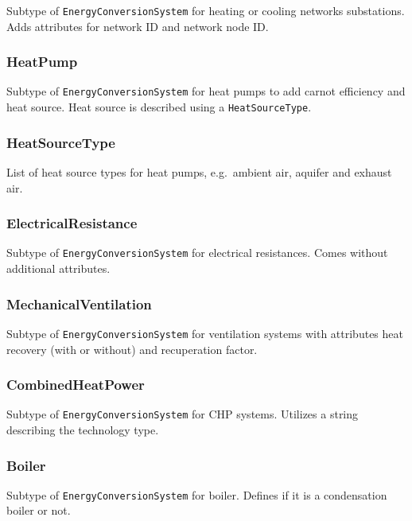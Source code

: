 \documentclass[a4paper,12pt]{article}
\begin{document}
Subtype of \lstinline!EnergyConversionSystem! for heating or cooling
networks substations. Adds attributes for network ID and network node
ID.

\subsubsection{HeatPump}\label{heatpump}

Subtype of \lstinline!EnergyConversionSystem! for heat pumps to add
carnot efficiency and heat source. Heat source is described using a
\lstinline!HeatSourceType!.

\subsubsection{HeatSourceType}\label{heatsourcetype}

List of heat source types for heat pumps, e.g.~ambient air, aquifer and
exhaust air.

\subsubsection{ElectricalResistance}\label{electricalresistance}

Subtype of \lstinline!EnergyConversionSystem! for electrical
resistances. Comes without additional attributes.

\subsubsection{MechanicalVentilation}\label{mechanicalventilation}

Subtype of \lstinline!EnergyConversionSystem! for ventilation systems
with attributes heat recovery (with or without) and recuperation factor.

\subsubsection{CombinedHeatPower}\label{combinedheatpower}

Subtype of \lstinline!EnergyConversionSystem! for CHP systems. Utilizes
a string describing the technology type.

\subsubsection{Boiler}\label{boiler}

Subtype of \lstinline!EnergyConversionSystem! for boiler. Defines if it
is a condensation boiler or not.
\end{document}
